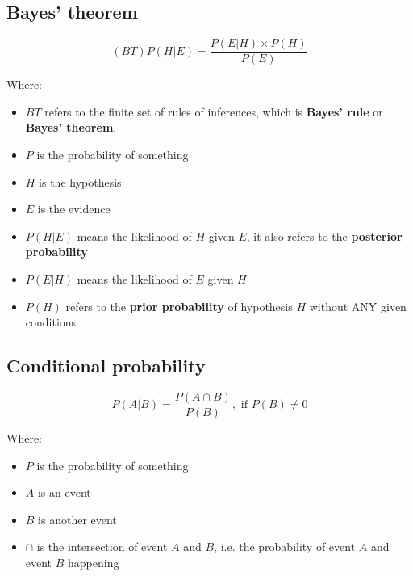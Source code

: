 \documentclass[11pt]{article}
\begin{document}
\subsection{Bayes' theorem}
\label{sec:org75326fe}
\[(BT) P(H | E) = \frac{P(E | H) \times P(H)}{P(E)}\]

Where:
\begin{itemize}
\item \(BT\) refers to the finite set of rules of inferences, which is \textbf{Bayes' rule} or \textbf{Bayes' theorem}.
\item \(P\) is the probability of something
\item \(H\) is the hypothesis
\item \(E\) is the evidence
\item \(P(H | E)\) means the likelihood of \(H\) given \(E\), it also refers to the \textbf{posterior probability}
\item \(P(E | H)\) means the likelihood of \(E\) given \(H\)
\item \(P(H)\) refers to the \textbf{prior probability} of hypothesis \(H\) without ANY given conditions
\end{itemize}
\subsection{Conditional probability}
\label{sec:org1b7a68a}
\[P(A | B) = \frac{P (A \cap B)}{P(B)}, \text{ if } P(B) \ne 0\]

Where:
\begin{itemize}
\item \(P\) is the probability of something
\item \(A\) is an event
\item \(B\) is another event
\item \(\cap\) is the intersection of event \(A\) and \(B\), i.e. the probability of event \(A\) and event \(B\) happening
\end{itemize}
\end{document}
